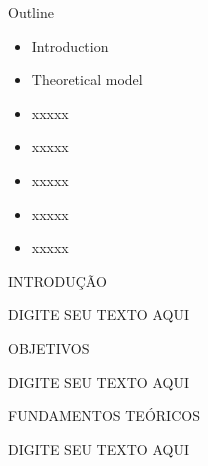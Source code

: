 \documentclass[a4paper,8pt]{article}
\title{\titulotrabalho}
\author{Nome do Autor}
\begin{document}
\vspace*{1cm}

\begin{flushleft}
\end{flushleft}


\begin{slide}{Outline}


\begin{itemize}
\item Introduction
\item Theoretical model
\item xxxxx
\item xxxxx
\item xxxxx
\item xxxxx
\item xxxxx

\end{itemize}

\end{slide}



\begin{slide}{INTRODUÇÃO}

\begin{minipage}{\columnwidth}

DIGITE SEU TEXTO AQUI


\end{minipage}
\end{slide}


\begin{slide}{OBJETIVOS}
\begin{minipage}{\columnwidth}

DIGITE SEU TEXTO AQUI
\end{minipage}
\end{slide}



\begin{slide}{FUNDAMENTOS TEÓRICOS}
\begin{minipage}{\columnwidth}

DIGITE SEU TEXTO AQUI
\end{minipage}
\end{slide}
\end{document}
